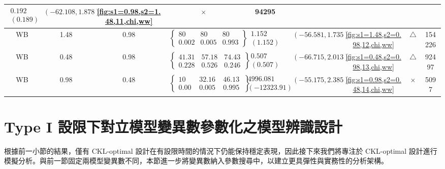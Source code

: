 \begin{table}[H]
\begin{adjustwidth}{-2.5cm}{-2.5cm}
{\begin{tabular}{|c|c|c|c|c|c|c|c|c|}
$\begin{array}{c}
0.192 \\
(0.189)
\end{array}$ & 
$(-62.108, 1.878)$ & 
\ref{fig:s1=0.98,s2=1.48,11,chi,ww} & $\times$ & 94295 \\
\hline
WB & 1.48 & 0.98 & $\left\{\begin{array}{ccc}
80 & 80 & 80 \\
0.002 & 0.005 & 0.993
\end{array}\right\}$ &
$\begin{array}{c}
1.152 \\
(1.152)
\end{array}$ & 
$(-56.581, 1.735)$ & 
\ref{fig:s1=1.48,s2=0.98,12,chi,ww} & $\triangle$ & 154226 \\
\hline
WB & 0.48 & 0.98 & $\left\{\begin{array}{ccc}
41.312 & 57.184 & 74.433 \\
0.228 & 0.526 & 0.246
\end{array}\right\}$ &
$\begin{array}{c}
0.507 \\
(0.507)
\end{array}$ & 
$(-66.715, 2.013)$ & 
\ref{fig:s1=0.48,s2=0.98,13,chi,ww} & $\triangle$ & 92497 \\
\hline
WB & 0.98 & 0.48 & $\left\{\begin{array}{ccc}
10 & 32.163 & 46.132 \\
0.000 & 0.005 & 0.995
\end{array}\right\}$ &
$\begin{array}{c}
4996.081 \\
(-12323.91)
\end{array}$ & 
$(-55.175, 2.385)$ & 
\ref{fig:s1=0.98,s2=0.48,14,chi,ww} & $\times$ & 5097 \\
\hline
\end{tabular}
}
\end{adjustwidth}
\end{table}

\section{Type I 設限下對立模型變異數參數化之模型辨識設計}

\hspace*{8mm} 根據前一小節的結果，僅有 CKL-optimal 設計在有設限時間的情況下仍能保持穩定表現，因此接下來我們將專注於 CKL-optimal 設計進行模擬分析。與前一節固定兩模型變異數不同，本節進一步將變異數納入參數搜尋中，以建立更具彈性與實務性的分析架構。

